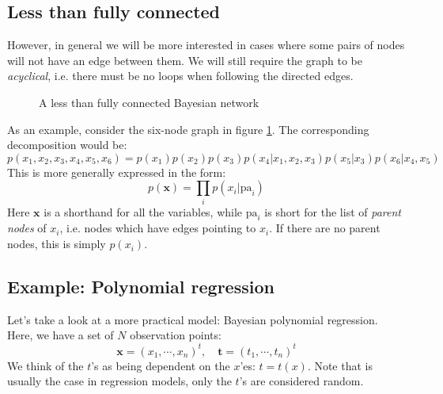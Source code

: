 \documentclass[12pt, a4paper]{article}
\numberwithin{equation}{section}
\begin{document}
\subsection{Less than fully connected}
However, in general we will be more interested in cases where some pairs of nodes will not have an edge between them. We will still require the graph to be \textit{acyclical}, i.e. there must be no loops when following the directed edges.

\begin{figure}
\centering
{}
\caption{A less than fully connected Bayesian network}
\label{graph:bn_notfull}
\end{figure}

As an example, consider the six-node graph in figure \ref{graph:bn_notfull}. The corresponding decomposition would be:
\begin{equation}
p(x_1, x_2, x_3, x_4, x_5, x_6)=p(x_1)p(x_2)p(x_3)p(x_4|x_1,x_2,x_3)p(x_5|x_3)p(x_6|x_4,x_5)
\end{equation}
This is more generally expressed in the form:
\begin{equation}
p(\mathbf{x})=\prod_i p(x_i|\textrm{pa}_i)
\label{parent_node_factorization}
\end{equation}
Here $\mathbf{x}$ is a shorthand for all the variables, while $\textrm{pa}_i$ is short for the list of \textit{parent nodes} of $x_i$, i.e. nodes which have edges pointing to $x_i$. If there are no parent nodes, this is simply $p(x_i)$.

\subsection{Example: Polynomial regression}
Let's take a look at a more practical model: Bayesian polynomial regression. Here, we have a set of $N$ observation points:
\begin{equation}
\mathbf{x}=(x_1,\cdots,x_n)^t,\quad \mathbf{t}=(t_1,\cdots,t_n)^t
\end{equation}
We think of the $t$'s as being dependent on the $x$'es: $t=t(x)$. Note that is usually the case in regression models, only the $t$'s are considered random.
\end{document}
